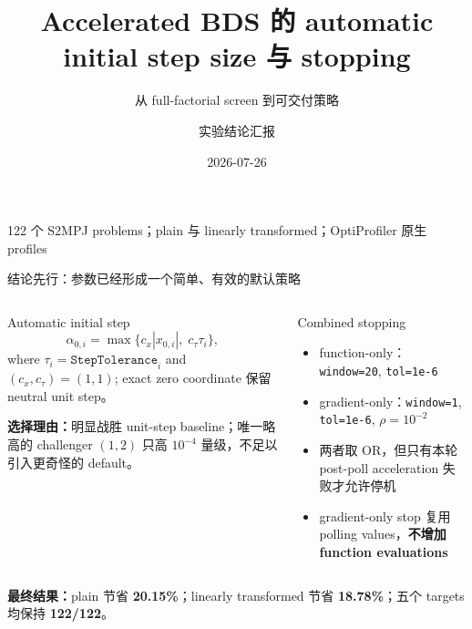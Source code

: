 \documentclass[aspectratio=169,10pt]{beamer}
\title{Accelerated BDS 的 automatic initial step size 与 stopping}
\subtitle{从 full-factorial screen 到可交付策略}
\author{实验结论汇报}
\date{2026-07-26}
\newcommand{\good}[1]{\textcolor{BDSGreen}{\bfseries #1}}
\newcommand{\tight}{\setlength{\itemsep}{0.35em}\setlength{\parskip}{0pt}}
\begin{document}
{
\begin{frame}[plain]
  \vfill
  \titlepage
  \vfill
  \begin{center}
    \color{white!80}\small 122 个 S2MPJ problems；plain 与 linearly transformed；OptiProfiler 原生 profiles
  \end{center}
\end{frame}}

\begin{frame}{结论先行：参数已经形成一个简单、有效的默认策略}
\begin{columns}[T,onlytextwidth]
\begin{block}{Automatic initial step}
\small
\[
\alpha_{0,i}=\max\{c_x|x_{0,i}|,\;c_\tau\tau_i\},
\]
where $\tau_i=\texttt{StepTolerance}_i$ and $(c_x,c_\tau)=(1,1)$;
exact zero coordinate 保留 neutral unit step。

\medskip
\good{选择理由：}明显战胜 unit-step baseline；唯一略高的 challenger $(1,2)$ 只高 $10^{-4}$ 量级，不足以引入更奇怪的 default。
\end{block}

\begin{block}{Combined stopping}
\begin{itemize}\tight
  \item function-only：\texttt{window=20}, \texttt{tol=1e-6}
  \item gradient-only：\texttt{window=1}, \texttt{tol=1e-6}, $\rho=10^{-2}$
  \item 两者取 OR，但只有本轮 post-poll acceleration 失败才允许停机
  \item gradient-only stop 复用 polling values，\good{不增加 function evaluations}
\end{itemize}
\end{block}
\end{columns}

\vspace{0.5em}
\centering
\colorbox{BDSLight}{\parbox{0.92\textwidth}{\centering
\good{最终结果：}plain 节省 \textbf{20.15\%}；linearly transformed 节省 \textbf{18.78\%}；五个 targets 均保持 \textbf{122/122}。}}
\end{frame}
\end{document}
